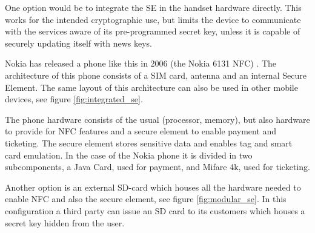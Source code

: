 




One option would be to integrate the SE in the handset hardware directly.
This works for the intended cryptographic use, but limits the device to communicate with the services aware of its pre-programmed secret key, unless it is capable of securely updating itself with news keys.

Nokia has released a phone like this in 2006 (the Nokia 6131 NFC) . %
The architecture of this phone consists of a SIM card, antenna and an internal Secure Element.
The same layout of this architecture can also be used in other mobile devices, see figure \ref{fig:integrated_se}.

The phone hardware consists of the usual (processor, memory), but also hardware to provide for NFC features and a secure element to enable payment and ticketing.
The secure element stores sensitive data and enables tag and smart card emulation.
In the case of the Nokia phone it is divided in two subcomponents, a Java Card, used for payment, and Mifare 4k, used for ticketing.


Another option is an external SD-card which houses all the hardware needed to enable NFC and also the secure element, see figure \ref{fig:modular_se}.
In this configuration a third party can issue an SD card to its customers which houses a secret key hidden from the user.

